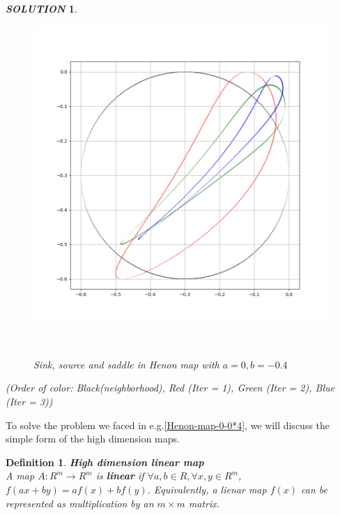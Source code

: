 \documentclass[12pt]{article}
\theoremstyle{plain}
\newtheorem{definition}{\textbf{Definition}}[section]
\newtheorem{solution}{\textit{SOLUTION}}[section]
\begin{document}
{\begin{solution}
\begin{figure}[H]
\begin{minipage}[c][0.45\width]{0.45\textwidth}
\end{minipage}
\begin{minipage}[c][0.25\width]{0.25\textwidth}
   \centering
   \includegraphics[width=\textwidth]{figure/section2/Henon-0-0*4-saddle.png} 
\end{minipage}
\\[3ex]\caption{Sink, source and saddle in Henon map with $a = 0, b = -0.4$}\label{sink-source-saddle-henon-map}
\end{figure}
(Order of color: {\color{black}Black(neighborhood)}, {\color{red} Red (Iter = 1)}, {\color{green} Green (Iter = 2)}, {\color{blue} Blue (Iter = 3)})

\end{solution}
}



To solve the problem we faced in e.g.\ref{Henon-map-0-0*4}, we will discuss the simple form of the high dimension maps.

\begin{definition}\textbf{High dimension linear map}
\\\noindent A map $A: R^m \rightarrow R^m$ is \textbf{linear} if $\forall a, b \in R, \forall x, y \in R^m$, $f(ax + by) = af(x) + bf(y)$. Equivalently, a lienar map $f(x)$ can be represented as multiplication by an $m \times m$ matrix.
\end{definition}
\end{document}

